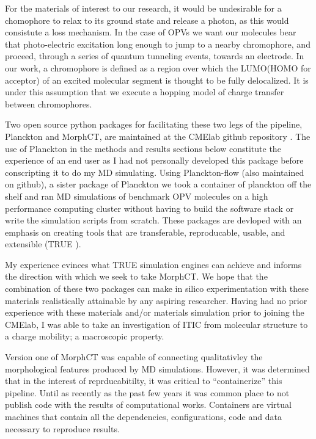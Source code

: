 For the materials of interest to our research, it would be undesirable for a chomophore to relax to its ground
state and release a photon, as this would consistute a loss mechanism. In the case of
OPVs we want our molecules bear that photo-electric
excitation long enough to jump to a nearby chromophore, and proceed, through a
series of quantum tunneling events, towards an electrode. 
In our work, a chromophore is defined as a region over which the
LUMO(HOMO for acceptor) of an excited molecular segment is thought to be fully delocalized. It is under this assumption that we execute a hopping model of charge transfer between
chromophores.  


Two open source python packages for
facilitating these two legs of the pipeline, Planckton and MorphCT, are maintained at 
the CMElab github repository \cite{cmelab}.
The use of Planckton in the methods and results sections below
constitute the experience of an end user as I had not personally developed this package before conscripting it
to do my MD simulating. Using Planckton-flow (also maintained on github), a sister package
of Planckton we took a container of planckton off the shelf and ran MD simulations of benchmark OPV
molecules on a high performance computing cluster without having to build the software stack or write the
simulation scripts from scratch. These packages are devloped with an emphasis on creating tools that are
transferable, reproducable, usable, and extensible (TRUE \cite{Cummings2017}).

My experience evinces what TRUE simulation engines can achieve and
informs the direction with which we seek to take MorphCT. We hope that the combination of these two packages
can make in silico experimentation with these materials realistically attainable by any aspiring researcher.
Having had no prior experience with these materials and/or materials simulation prior to joining the CMElab,
I was able to take an investigation of ITIC from molecular
structure to a charge mobility; a macroscopic property. 

Version one of MorphCT was capable of
connecting qualitativley the morphological features produced by MD simulations. However, it was determined
that in the interest of reprducabitilty, it was critical to ``containerize'' this pipeline. Until as recently as
the past few years it was common place to not publish code with the results of computational works. Containers
are virtual machines that contain all the dependencies, configurations, code and data necessary to reproduce
results. \cite{Cito2016a}

